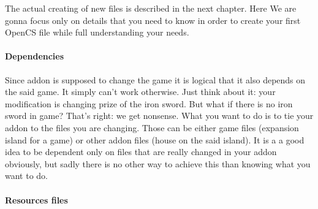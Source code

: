
The actual creating of new files is described in the next chapter. Here We are gonna focus only on details that you need to know in order to create your first Open{CS} file while full understanding your needs.

\paragraph{Dependencies}
Since addon is supposed to change the game it is logical that it also depends on the said game. It simply can't work otherwise. Just think about it: your modification is changing prize of the iron sword. But what if there is no iron sword in game? That's right: we get nonsense. What you want to do is to tie your addon to the files you are changing. Those can be either game files (expansion island for a game) or other addon files (house on the said island). It is a a good idea to be dependent only on files that are really changed in your addon obviously, but sadly there is no other way to achieve this than knowing what you want to do.

\paragraph{Resources files}
